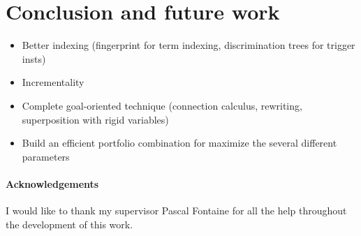 \message{ !name(main.tex)}\documentclass{easychair}
\begin{document}
\section{Conclusion and future work}
\label{sec:conclusion}

\begin{itemize}
  \item Better indexing (fingerprint for term indexing, discrimination trees for trigger
  insts)
  \item Incrementality
  \item Complete goal-oriented technique (connection calculus,
  rewriting, superposition with rigid variables)
  \item Build an efficient portfolio combination for maximize the
  several different parameters
\end{itemize}


\paragraph{Acknowledgements} I would like to thank my supervisor
Pascal Fontaine for all the help throughout the development of this
work.



\end{document}
